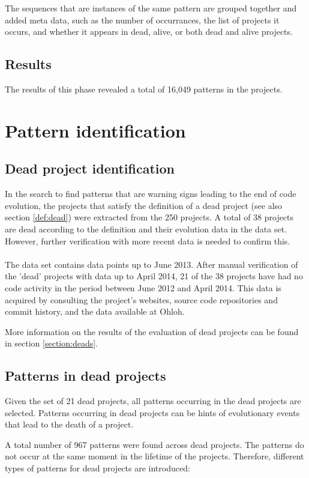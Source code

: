 The sequences that are instances of the same pattern are grouped together and
added meta data, such as the number of occurrances, the list of projects
it occurs, and whether it appears in dead, alive, or both dead and alive
projects.

\subsection{Results}
The results of this phase revealed a total of 16,049 patterns in the projects.

\section{Pattern identification}
\subsection{Dead project identification}
In the search to find patterns that are warning signs leading to the end of
code evolution, the projects that satisfy the definition of a dead project (see
also section \ref{def:dead}) were extracted from the 250 projects.
A total of 38 projects are dead according to the definition and their evolution
data in the data set. However, further verification with more recent data is
needed to confirm this.

\paragraph{}
The data set contains data points up to June 2013. After manual verification of
the 'dead' projects with data up to April 2014, 21 of the 38 projects have had
no code activity in the period between June 2012 and April 2014. This data is
acquired by consulting the project's websites, source code repositories and
commit history, and the data available at Ohloh.

More information on the results of the evaluation of dead projects can be found
in section \ref{section:deads}.

\subsection{Patterns in dead projects}
Given the set of 21 dead projects, all patterns occurring in the dead
projects are selected. Patterns occurring in dead projects can be hints of
evolutionary events that lead to the death of a project.

A total number of 967 patterns were found across dead projects. The patterns
do not occur at the same moment in the lifetime of the projects. Therefore,
different types of patterns for dead projects are introduced:

